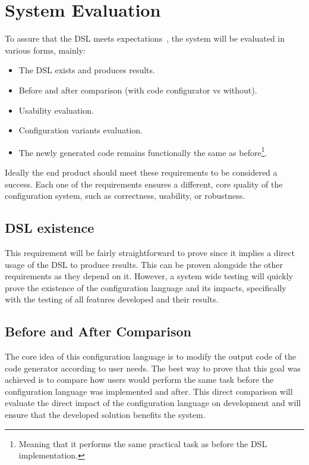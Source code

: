 \section{System Evaluation}
\label{sec:sys_eval}

To assure that the \gls{DSL} meets expectations~\cite{Voelter_Benz_2013}, the system will be evaluated in various forms, mainly:

\begin{itemize}
	\item The \gls{DSL} exists and produces results.
	\item Before and after comparison (with code configurator vs without).
	\item Usability evaluation.
	\item Configuration variants evaluation.
	\item The newly generated code remains functionally the same as before\footnote{Meaning that it performs the same practical task as before the \gls{DSL} implementation.}.
\end{itemize}

Ideally the end product should meet these requirements to be considered a success. Each one of the requirements ensures a different, core quality of the configuration system, such as correctness, usability, or robustness.

\subsection*{DSL existence}

This requirement will be fairly straightforward to prove since it implies a direct usage of the \gls{DSL} to produce results. This can be proven alongside the other requirements as they depend on it. However, a system wide testing will quickly prove the existence of the configuration language and its impacts, specifically with the testing of all features developed and their results.

\subsection*{Before and After Comparison}

The core idea of this configuration language is to modify the output code of the code generator according to user needs. The best way to prove that this goal was achieved is to compare how users would perform the same task before the configuration language was implemented and after. This direct comparison will evaluate the direct impact of the configuration language on development and will ensure that the developed solution benefits the system. 

